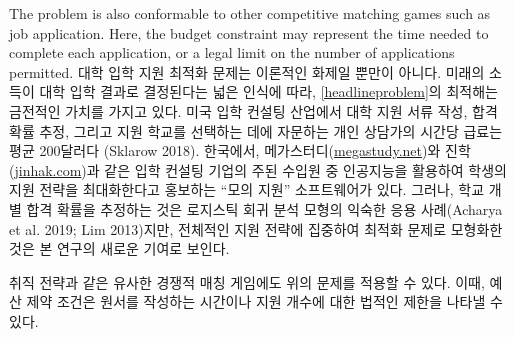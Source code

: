 \documentclass[11pt]{article} %
\theoremstyle{definition}
\theoremstyle{definition}
\begin{document}
The problem is also conformable to other competitive matching games such as job application. Here, the budget constraint may represent the time needed to complete each application, or a legal limit on the number of applications permitted.
\else
대학 입학 지원 최적화 문제는 이론적인 화제일 뿐만이 아니다. 미래의 소득이 대학 입학 결과로 결정된다는 넓은 인식에 따라, \eqref{headlineproblem}의 최적해는 금전적인 가치를 가지고 있다. 미국 입학 컨설팅 산업에서 대학 지원 서류 작성, 합격 확률 추정, 그리고 지원 학교를 선택하는 데에 자문하는 개인 상담가의 시간당 급료는 평균 200달러다 (Sklarow 2018). 한국에서, 메가스터디(\url{megastudy.net})와 진학(\url{jinhak.com})과 같은 입학 컨설팅 기업의 주된 수입원 중 인공지능을 활용하여 학생의 지원 전략을 최대화한다고 홍보하는 ``모의 지원'' 소프트웨어가 있다. 그러나, 학교 개별 합격 확률을 추정하는 것은 로지스틱 회귀 분석 모형의 익숙한 응용 사례(Acharya et al. 2019; Lim 2013)지만, 전체적인 지원 전략에 집중하여 최적화 문제로 모형화한 것은 본 연구의 새로운 기여로 보인다.

취직 전략과 같은 유사한 경쟁적 매칭 게임에도 위의 문제를 적용할 수 있다. 이때, 예산 제약 조건은 원서를 작성하는 시간이나 지원 개수에 대한 법적인 제한을 나타낼 수 있다.
\fi
\end{document}
